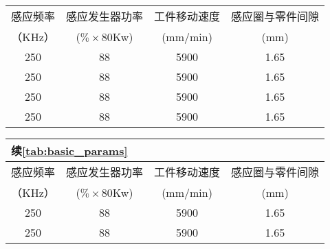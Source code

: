 \begin{table}[!htbp]
    \centering
    \label{tab:basic_params}
    \begin{tabular}{cccc}
    \toprule
    感应频率 &感应发生器功率 & 工件移动速度  &感应圈与零件间隙\\
    （KHz）&($\% \times$80Kw) &(mm/min)  &(mm)\\
    \midrule
    250 &88 &5900 &1.65\\
    250 &88 &5900 &1.65\\
    250 &88 &5900 &1.65\\
    250 &88 &5900 &1.65\\
    \bottomrule
    \end{tabular}
\end{table}


\begin{table}
    \centering
    \begin{tabular}{cccc}
    \multicolumn{4}{l}{\textbf{续\autoref{tab:basic_params}}}
    \vspace{6pt}\\
    \toprule
    感应频率 &感应发生器功率 & 工件移动速度  &感应圈与零件间隙\\
    （KHz）&($\% \times$80Kw) &(mm/min)  &(mm)\\
    \midrule
    250 &88 &5900 &1.65\\
    250 &88 &5900 &1.65\\
    \bottomrule
    \end{tabular}
\end{table}

